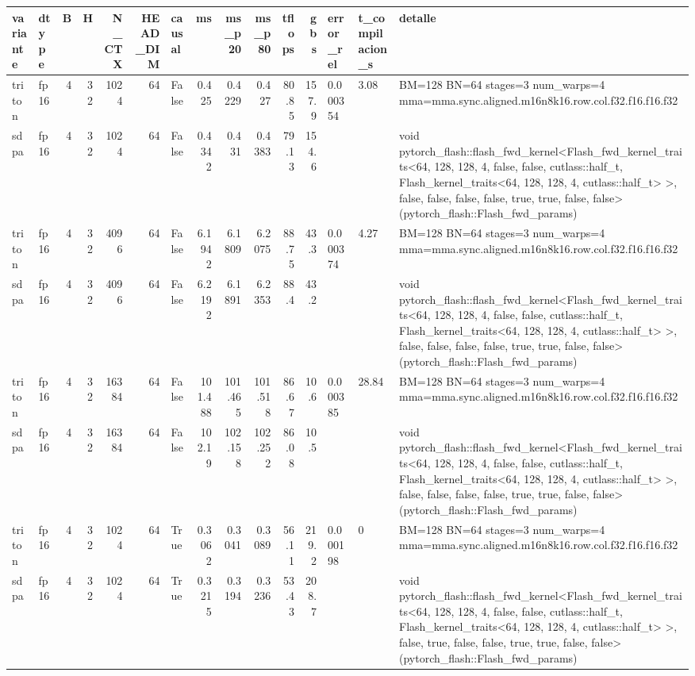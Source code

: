 \begin{table}[htbp]
  \centering\small
  \begin{tabular}{llrrrrlrrrrrlll}
    \toprule
    variante & dtype & B & H & N\_CTX & HEAD\_DIM & causal & ms & ms\_p20 & ms\_p80 & tflops & gbs & error\_rel & t\_compilacion\_s & detalle \\
    \midrule
    triton & fp16 & 4 & 32 & 1024 & 64 & False & 0.425 & 0.4229 & 0.427 & 80.85 & 157.9 & 0.000354 & 3.08 & BM=128 BN=64 stages=3 num\_warps=4 mma=mma.sync.aligned.m16n8k16.row.col.f32.f16.f16.f32 \\
    sdpa & fp16 & 4 & 32 & 1024 & 64 & False & 0.4342 & 0.431 & 0.4383 & 79.13 & 154.6 &  &  & void pytorch\_flash::flash\_fwd\_kernel<Flash\_fwd\_kernel\_traits<64, 128, 128, 4, false, false, cutlass::half\_t, Flash\_kernel\_traits<64, 128, 128, 4, cutlass::half\_t> >, false, false, false, false, true, true, false, false>(pytorch\_flash::Flash\_fwd\_params) \\
    triton & fp16 & 4 & 32 & 4096 & 64 & False & 6.1942 & 6.1809 & 6.2075 & 88.75 & 43.3 & 0.000374 & 4.27 & BM=128 BN=64 stages=3 num\_warps=4 mma=mma.sync.aligned.m16n8k16.row.col.f32.f16.f16.f32 \\
    sdpa & fp16 & 4 & 32 & 4096 & 64 & False & 6.2192 & 6.1891 & 6.2353 & 88.4 & 43.2 &  &  & void pytorch\_flash::flash\_fwd\_kernel<Flash\_fwd\_kernel\_traits<64, 128, 128, 4, false, false, cutlass::half\_t, Flash\_kernel\_traits<64, 128, 128, 4, cutlass::half\_t> >, false, false, false, false, true, true, false, false>(pytorch\_flash::Flash\_fwd\_params) \\
    triton & fp16 & 4 & 32 & 16384 & 64 & False & 101.488 & 101.465 & 101.518 & 86.67 & 10.6 & 0.000385 & 28.84 & BM=128 BN=64 stages=3 num\_warps=4 mma=mma.sync.aligned.m16n8k16.row.col.f32.f16.f16.f32 \\
    sdpa & fp16 & 4 & 32 & 16384 & 64 & False & 102.19 & 102.158 & 102.252 & 86.08 & 10.5 &  &  & void pytorch\_flash::flash\_fwd\_kernel<Flash\_fwd\_kernel\_traits<64, 128, 128, 4, false, false, cutlass::half\_t, Flash\_kernel\_traits<64, 128, 128, 4, cutlass::half\_t> >, false, false, false, false, true, true, false, false>(pytorch\_flash::Flash\_fwd\_params) \\
    triton & fp16 & 4 & 32 & 1024 & 64 & True & 0.3062 & 0.3041 & 0.3089 & 56.11 & 219.2 & 0.000198 & 0 & BM=128 BN=64 stages=3 num\_warps=4 mma=mma.sync.aligned.m16n8k16.row.col.f32.f16.f16.f32 \\
    sdpa & fp16 & 4 & 32 & 1024 & 64 & True & 0.3215 & 0.3194 & 0.3236 & 53.43 & 208.7 &  &  & void pytorch\_flash::flash\_fwd\_kernel<Flash\_fwd\_kernel\_traits<64, 128, 128, 4, false, false, cutlass::half\_t, Flash\_kernel\_traits<64, 128, 128, 4, cutlass::half\_t> >, false, true, false, false, true, true, false, false>(pytorch\_flash::Flash\_fwd\_params) \\

\end{tabular}
\end{table}
